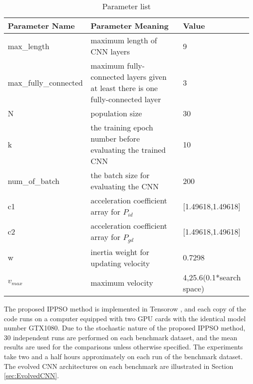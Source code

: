 \documentclass[conference]{IEEEtran}
\begin{document}
\begin{table}[!t]
	\renewcommand{\arraystretch}{1.3}
	\caption{Parameter list}
	\label{table:ParameterList}
	\centering
	\begin{tabular}{|p{2.5cm}|p{3cm}|p{2cm}|}
		\hline
		Parameter Name & Parameter Meaning & Value\\
		\hline
		max\_length & maximum length of CNN layers & 9\\
		\hline
		max\_fully\_connected & maximum fully-connected layers given at least there is one fully-connected layer & 3\\
		\hline
		N & population size & 30\\
		\hline
		k & the training epoch number before evaluating the trained CNN & 10\\
		\hline
		num\_of\_batch & the batch size for evaluating the CNN & 200\\
		\hline
		c1 & acceleration coefficient array for $P_{id}$ & [1.49618,1.49618]\\
		\hline
		c2 & acceleration coefficient array for $P_{gd}$ & [1.49618,1.49618]\\
		\hline
		w & inertia weight for updating velocity & 0.7298\\
		\hline
		$v_{max}$ & maximum velocity & 4,25.6(0.1*search space)\\
		\hline
	\end{tabular}
\end{table}

The proposed IPPSO method is implemented in Tensorow \cite{Tensorfow:Abadi}, and each copy of the code runs on a computer equipped with two GPU cards with the identical model number GTX1080. Due to the stochastic nature of the proposed IPPSO method, 30 independent runs are performed on each benchmark dataset, and the mean results are used for the comparisons unless otherwise specified. The experiments take two and a half hours approximately on each run of the benchmark dataset.
The evolved CNN architectures on each benchmark are illustrated in Section \ref{sec:EvolvedCNN}.
\end{document}
